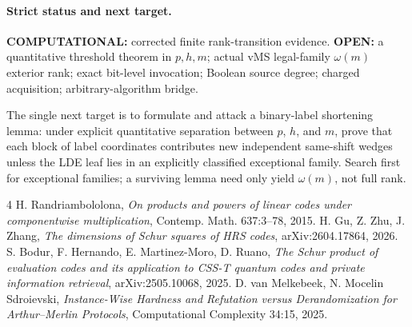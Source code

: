 \documentclass[11pt]{article}
\begin{document}
\paragraph{Strict status and next target.}
\textbf{COMPUTATIONAL:} corrected finite rank-transition evidence.
\textbf{OPEN:} a quantitative threshold theorem in $p,h,m$; actual vMS legal-family $\omega(m)$ exterior rank; exact bit-level invocation; Boolean source degree; charged acquisition; arbitrary-algorithm bridge.

The single next target is to formulate and attack a binary-label shortening lemma: under explicit quantitative separation between $p$, $h$, and $m$, prove that each block of label coordinates contributes new independent same-shift wedges unless the LDE leaf lies in an explicitly classified exceptional family. Search first for exceptional families; a surviving lemma need only yield $\omega(m)$, not full rank.

\begin{thebibliography}{4}
 H. Randriambololona, \emph{On products and powers of linear codes under componentwise multiplication}, Contemp. Math. 637:3--78, 2015.
 H. Gu, Z. Zhu, J. Zhang, \emph{The dimensions of Schur squares of HRS codes}, arXiv:2604.17864, 2026.
 S. Bodur, F. Hernando, E. Martinez-Moro, D. Ruano, \emph{The Schur product of evaluation codes and its application to CSS-T quantum codes and private information retrieval}, arXiv:2505.10068, 2025.
 D. van Melkebeek, N. Mocelin Sdroievski, \emph{Instance-Wise Hardness and Refutation versus Derandomization for Arthur--Merlin Protocols}, Computational Complexity 34:15, 2025.
\end{thebibliography}
\end{document}
